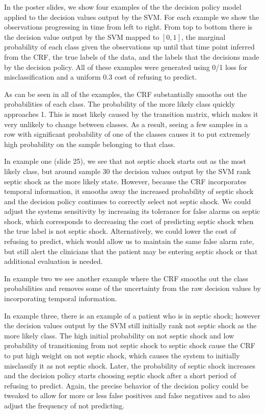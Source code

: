 \documentclass[12pt,solutions]{article}
\begin{document}
In the poster slides, we show four examples of the the decision policy model applied to the decision values output by the SVM. For each example we show the observations progressing in time from left to right. From top to bottom there is the decision value output by the SVM mapped to $[0,1]$, the marginal probability of each class given the observations up until that time point inferred from the CRF, the true labels of the data, and the labels that the decisions made by the decision policy. All of these examples were generated using 0/1 loss for misclassification and a uniform 0.3 cost of refusing to predict.

As can be seen in all of the examples, the CRF substantially smooths out the probabilities of each class. The probability of the more likely class quickly approaches 1. This is most likely caused by the transition matrix, which makes it very unlikely to change between classes. As a result, seeing a few samples in a row with significant probability of one of the classes causes it to put extremely high probability on the sample belonging to that class.

In example one (slide 25), we see that not septic shock starts out as the most likely class, but around sample 30 the decision values output by the SVM rank septic shock as the more likely state. However, because the CRF incorporates temporal information, it smooths away the increased probability of septic shock and the decision policy continues to correctly select not septic shock. We could adjust the systems sensitivity by increasing its tolerance for false alarms on septic shock, which corresponds to decreasing the cost of predicting septic shock when the true label is not septic shock. Alternatively, we could lower the cost of refusing to predict, which would allow us to maintain the same false alarm rate, but still alert the clinicians that the patient may be entering septic shock or that additional evaluation is needed.

In example two we see another example where the CRF smooths out the class probabilities and removes some of the uncertainty from the raw decision values by incorporating temporal information.

In example three, there is an example of a patient who is in septic shock; however the decision values output by the SVM still initially rank not septic shock as the more likely class. The high initial probability on not septic shock and low probability of transitioning from not septic shock to septic shock cause the CRF to put high weight on not septic shock, which causes the system to initially misclassify it as not septic shock. Later, the probability of septic shock increases and the decision policy starts choosing septic shock after a short period of refusing to predict. Again, the precise behavior of the decision policy could be tweaked to allow for more or less false positives and false negatives and to also adjust the frequency of not predicting.
\end{document}
